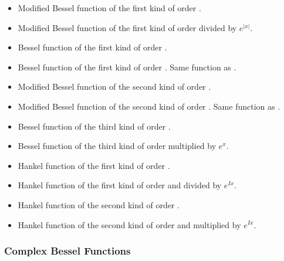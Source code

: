 \begin{itemize}
\item {}
  \sshortdescribe   Modified Bessel function of the first
  kind of order .
\item {}
  \sshortdescribe   Modified Bessel function of the first
  kind of order  divided by $e^{|x|}$.
\item {}
  \sshortdescribe    Bessel function of the first
  kind of order .
\item {}
  \sshortdescribe    Bessel function of the first
  kind of order . Same function as .
\item {}
  \sshortdescribe   Modified Bessel function of the second
  kind of order .
\item {}
  \sshortdescribe   Modified Bessel function of the second
  kind of order . Same function as .
\item {}
  \sshortdescribe   Bessel function of the third
  kind of order .
\item {}
  \sshortdescribe   Bessel function of the third
  kind of order  multiplied by $e^{x}$.
\item {}
  \sshortdescribe   Hankel function of the first kind of
  order . 
\item {}
  \sshortdescribe  Hankel function of the first kind of order
    and divided by $e^{I x}$.
\item {}
  \sshortdescribe  Hankel function of the second kind of
  order . 
\item {}
  \sshortdescribe  Hankel function of the second kind of
  order   and multiplied by $e^{I x}$.
\end{itemize}

\subsubsection{Complex Bessel Functions}

